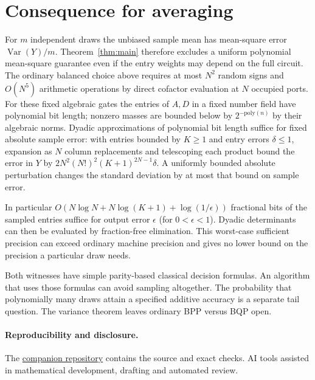 \documentclass[11pt]{article}
\DeclareMathOperator{\Var}{Var}
\begin{document}
\section{Consequence for averaging}
For \(m\) independent draws the unbiased sample mean has mean-square error \(\Var(Y)/m\). Theorem~\ref{thm:main} therefore excludes a uniform polynomial mean-square guarantee even if the entry weights may depend on the full circuit. The ordinary balanced choice above requires at most \(N^2\) random signs and \(O(N^5)\) arithmetic operations by direct cofactor evaluation at \(N\) occupied ports. For these fixed algebraic gates the entries of \(A,D\) in a fixed number field have polynomial bit length; nonzero masses are bounded below by \(2^{-\mathrm{poly}(n)}\) by their algebraic norms. Dyadic approximations of polynomial bit length suffice for fixed absolute sample error: with entries bounded by \(K\ge1\) and entry errors \(\delta\le1\), expansion as \(N\) column replacements and telescoping each product bound the error in \(Y\) by \(2N^2(N!)^2(K+1)^{2N-1}\delta\). A uniformly bounded absolute perturbation changes the standard deviation by at most that bound on sample error.

In particular \(O(N\log N+N\log(K+1)+\log(1/\epsilon))\) fractional bits of the sampled entries suffice for output error \(\epsilon\) (for \(0<\epsilon<1\)). Dyadic determinants can then be evaluated by fraction-free elimination. This worst-case sufficient precision can exceed ordinary machine precision and gives no lower bound on the precision a particular draw needs.

Both witnesses have simple parity-based classical decision formulas. An algorithm that uses those formulas can avoid sampling altogether. The probability that polynomially many draws attain a specified additive accuracy is a separate tail question. The variance theorem leaves ordinary BPP versus BQP open.

\paragraph{Reproducibility and disclosure.} The \href{https://github.com/Quantyra/optical-determinant-variance}{companion repository} contains the source and exact checks. AI tools assisted in mathematical development, drafting and automated review.
\end{document}
